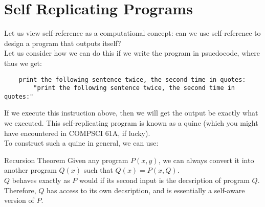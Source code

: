 \section{Self Replicating Programs}
Let us view self-reference as a computational concept: can we use self-reference to design a program that outputs itself? \\
Let us consider how we can do this if we write the program in psuedocode, where thus we get:
\begin{verbatim}
    print the following sentence twice, the second time in quotes:
        "print the following sentence twice, the second time in quotes:"
\end{verbatim}
If we execute this instruction above, then we will get the output be exactly what we executed. This self-replicating program is known as a quine (which you might have encountered in COMPSCI 61A, if lucky). \\
To construct such a quine in general, we can use:
\begin{ln-theorem}{Recursion Theorem}{}
    Given any program $P(x, y)$, we can always convert it into another program $Q(x)$ such that $Q(x) = P(x, Q)$. \\
    $Q$ behaves exactly as $P$ would if its second input is the decsription of program $Q$. \\
    Therefore, $Q$ has access to its own decsription, and is essentially a self-aware version of $P$.
\end{ln-theorem}

